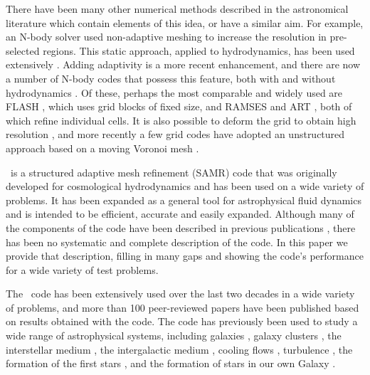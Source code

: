 There have been many other numerical methods described in the astronomical literature which contain elements of this idea, or have a similar aim.  For example, an N-body solver \citep{Villumsen89} used non-adaptive meshing to increase the resolution in pre-selected regions.  This static approach, applied to hydrodynamics, has been used extensively \citep[e.g.,][]{Ruffert94, Anninos94}.  Adding adaptivity is a more recent enhancement, and there are now a number of N-body codes that possess this feature, both with and without  hydrodynamics  \citep{Couchman91, Jessop94, Suisalu95, Splinter96, Gelato97, ART97, Truelove98, flash_method, MLAPM01,  Yahagi01, RAMSES, Quilis04, Ziegler05, Zhang06, Astrobear09, Pluto-amr, GAMER, Nyx}.  Of these, perhaps the most comparable and widely used are FLASH \citep{flash_method}, which uses grid blocks of fixed size, and RAMSES \citep{RAMSES} and ART \citep{ART97}, both of which refine individual cells.   It is also possible to deform the grid to obtain high resolution \citep[e.g.,][]{Gnedin95, Xu97, Pen98}, and more recently a few grid codes have adopted an unstructured approach based on a moving Voronoi mesh \citep{Arepo10, Tess11}.

\enzo\ is a structured adaptive mesh refinement (SAMR) code that was originally developed for cosmological hydrodynamics and has been used on a wide variety of problems.  It has been expanded as a general tool for astrophysical fluid dynamics and is intended to be efficient, accurate and easily expanded.  Although many of the components of the code have been described in previous publications \citep{1995CoPhC..89..149B, BryanThesis96, Bryan97a, Bryan97b, Norman99, BryanCompSci99, Bryan01, Oshea04, 2007arXiv0705.1556N, WangAbelZhang08,ReynoldsHayesPaschosNorman2009,Collins10,Wise11_Moray}, there has been no systematic and complete description of the code.  In this paper we provide that description, filling in many gaps and showing the code's performance for a wide variety of test problems.

The \enzo\ code has been extensively used over the last two decades in a wide variety of problems, and more than 100 peer-reviewed papers have been published based on results obtained with the code.  The code has previously been used to study a wide range of astrophysical systems, including galaxies \citep{2003ApJ...587...13T, 2012ApJ...749..140H}, galaxy clusters \citep{Loken02, Skillman13}, the interstellar medium \citep{Slyz05}, the intergalactic medium \citep{Fang01, 2011ApJ...731....6S}, cooling flows \citep{Li12, 2013ApJ...763...38S}, turbulence \citep{Kritsuk04, 2009JPhCS.180a2020K, Collins11}, the formation of the first stars \citep{ABN02, 2007ApJ...654...66O, 2009Sci...325..601T}, and the formation of stars in our own Galaxy \citep{Collins12a}.

